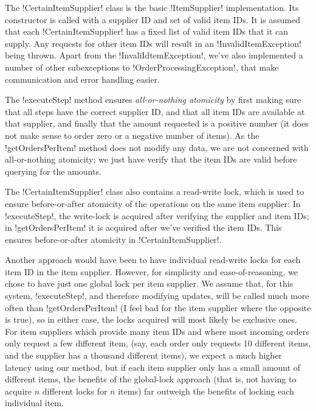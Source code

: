 \documentclass[a4paper, 12pt]{article}
\begin{document}



The !CertainItemSupplier! class is the basic !ItemSupplier!
implementation. Its constructor is called with a supplier ID and set
of valid item IDs. It is assumed that each !CertainItemSupplier! has a
fixed list of valid item IDs that it can supply. Any requests for
other item IDs will result in an !InvalidItemException! being
thrown. Apart from the !InvaliIdtemException!, we've also implemented
a number of other subexceptions to !OrderProcessingException!, that
make communication and error handling easier.

The !executeStep! method ensures \emph{all-or-nothing atomicity} by
first making sure that all steps have the correct supplier ID, and
that all item IDs are available at that supplier, and finally that the
amount requested is a positive number (it does not make sense to order
zero or a negative number of items). As the !getOrdersPerItem! method
does not modify any data, we are not concerned with all-or-nothing
atomicity; we just have verify that the item IDs are valid before
querying for the amounts.

The !CertainItemSupplier! class also contains a read-write lock, which
is used to ensure before-or-after atomicity of the operations on the
same item supplier: In !executeStep!, the write-lock is acquired after
verifying the supplier and item IDs; in !getOrdersPerItem! it is
acquired after we've verified the item IDs. This ensures
before-or-after atomicity in !CertainItemSupplier!.

Another approach would have been to have individual read-write locks
for each item ID in the item supplier. However, for simplicity and
ease-of-reasoning, we chose to have just one global lock per item
supplier. We assume that, for this system, !executeStep!, and
therefore modifying updates, will be called much more often than
!getOrdersPerItem! (I feel bad for the item supplier where the
opposite is true), so in either case, the locks acquired will most
likely be exclusive ones. For item suppliers which provide many item
IDs and where most incoming orders only request a few different item,
(say, each order only requests 10 different items, and the supplier
has a thousand different items), we expect a much higher latency using
our method, but if each item supplier only has a small amount of
different items, the benefits of the global-lock approach (that is,
not having to acquire $n$ different locks for $n$ items) far outweigh
the benefits of locking each individual item.
\end{document}
